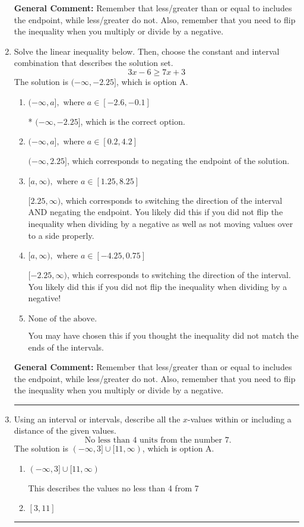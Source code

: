 \documentclass{extbook}[14pt]
\newcommand{\litem}[1]{\item #1

\rule{\textwidth}{0.4pt}}
\begin{document}
\begin{enumerate}
{\textbf{General Comment:} Remember that less/greater than or equal to includes the endpoint, while less/greater do not. Also, remember that you need to flip the inequality when you multiply or divide by a negative.
}
\litem{
Solve the linear inequality below. Then, choose the constant and interval combination that describes the solution set.
\[ 3x -6 \geq 7x + 3 \]The solution is \( (-\infty, -2.25] \), which is option A.\begin{enumerate}[label=\Alph*.]
\item \( (-\infty, a], \text{ where } a \in [-2.6, -0.1] \)

* $(-\infty, -2.25]$, which is the correct option.
\item \( (-\infty, a], \text{ where } a \in [0.2, 4.2] \)

 $(-\infty, 2.25]$, which corresponds to negating the endpoint of the solution.
\item \( [a, \infty), \text{ where } a \in [1.25, 8.25] \)

 $[2.25, \infty)$, which corresponds to switching the direction of the interval AND negating the endpoint. You likely did this if you did not flip the inequality when dividing by a negative as well as not moving values over to a side properly.
\item \( [a, \infty), \text{ where } a \in [-4.25, 0.75] \)

 $[-2.25, \infty)$, which corresponds to switching the direction of the interval. You likely did this if you did not flip the inequality when dividing by a negative!
\item \( \text{None of the above}. \)

You may have chosen this if you thought the inequality did not match the ends of the intervals.
\end{enumerate}

\textbf{General Comment:} Remember that less/greater than or equal to includes the endpoint, while less/greater do not. Also, remember that you need to flip the inequality when you multiply or divide by a negative.
}
\litem{
Using an interval or intervals, describe all the $x$-values within or including a distance of the given values.
\[ \text{ No less than } 4 \text{ units from the number } 7. \]The solution is \( (-\infty, 3] \cup [11, \infty) \), which is option A.\begin{enumerate}[label=\Alph*.]
\item \( (-\infty, 3] \cup [11, \infty) \)

This describes the values no less than 4 from 7
\item \( [3, 11] \)


\end{enumerate}}
\end{enumerate}
\end{document}
